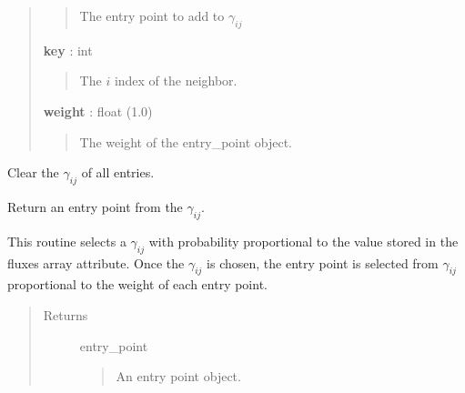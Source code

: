 \documentclass[letterpaper,10pt,english]{sphinxmanual}
\begin{document}
\begin{fulllineitems}
\begin{fulllineitems}
\begin{quote}
\begin{description}
\begin{quote}
The entry point to add to \(\gamma_{ij}\)
\end{quote}

\textbf{key} : int
\begin{quote}

The \(i\) index of the neighbor.
\end{quote}

\textbf{weight} : float (1.0)
\begin{quote}

The weight of the entry\_point object.
\end{quote}

\end{description}\end{quote}

\end{fulllineitems}


\begin{fulllineitems}
\label{neus/neus.doc:neus.window.Window.clear_flux_list}
Clear the \(\gamma_{ij}\) of all entries.

\end{fulllineitems}


\begin{fulllineitems}
\label{neus/neus.doc:neus.window.Window.get_entry_point}
Return an entry point from the \(\gamma_{ij}\).

This routine selects a \(\gamma_{ij}\) with probability proportional to the value stored in the fluxes array attribute. Once the \(\gamma_{ij}\) is chosen, the entry point is selected from \(\gamma_{ij}\) proportional to the weight of each entry point.
\begin{quote}\begin{description}
\item[{Returns}] \leavevmode
entry\_point
\begin{quote}

An entry point object.
\end{quote}

\end{description}\end{quote}

\end{fulllineitems}


\end{fulllineitems}
\end{document}
